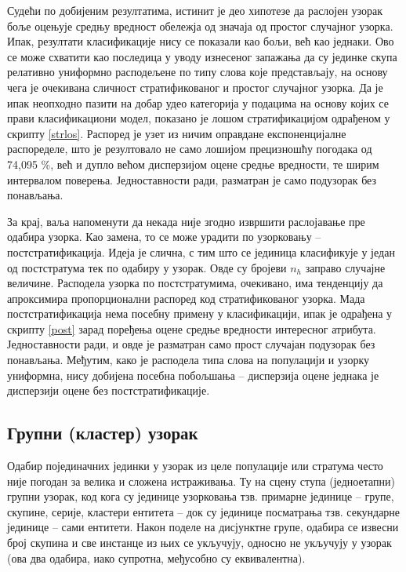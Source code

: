 \documentclass[a4paper]{article}
\begin{document}
Судећи по добијеним резултатима, истинит је део хипотезе да раслојен узорак боље оцењује средњу вредност обележја од значаја од простог случајног узорка. Ипак, резултати класификације нису се показали као бољи, већ као једнаки. Ово се може схватити као последица у уводу изнесеног запажања да су јединке скупа релативно униформно расподељене по типу слова које представљају, на основу чега је очекивана сличност стратификованог и простог случајног узорка. Да је ипак неопходно пазити на добар удео категорија у подацима на основу којих се прави класификациони модел,\cite{strat} показано је лошом стратификацијом одрађеном у скрипту \ref{strlos}. Распоред је узет из ничим оправдане експоненцијалне распоределе, што је резултовало не само лошијом прецизношћу погодака од 74,095 \%, већ и дупло већом дисперзијом оцене средње вредности, те ширим интервалом поверења. Једноставности ради, разматран је само подузорак без понављања.



За крај, ваља напоменути да некада није згодно извршити раслојавање пре одабира узорка. Као замена, то се може урадити по узорковању -- постстратификација.\cite{prez9} Идеја је слична, с тим што се јединица класификује у један од постстратума тек по одабиру у узорак. Овде су бројеви $n_h$ заправо случајне величине. Расподела узорка по постстратумима, очекивано, има тенденцију да апроксимира пропорционални распоред код стратификованог узорка. Мада постстратификација нема посебну примену у класификацији, ипак је одрађена у скрипту \ref{post} зарад поређења оцене средње вредности интересног атрибута. Једноставности ради, и овде је разматран само прост случајан подузорак без понављања. Међутим, како је расподела типа слова на популацији и узорку униформна, нису добијена посебна побољшања -- дисперзија оцене једнака је дисперзији оцене без постстратификације.



\subsection{Групни (кластер) узорак}

Одабир појединачних јединки у узорак из целе популације или стратума често није погодан за велика и сложена истраживања. Ту на сцену ступа (једноетапни) групни узорак, код кога су јединице узорковања тзв. примарне јединице -- групе, скупине, серије, кластери ентитета -- док су јединице посматрања тзв. секундарне јединице -- сами ентитети.\cite{prez9} Након поделе на дисјунктне групе, одабира се извесни број скупина и све инстанце из њих се укључују, односно не укључују у узорак (ова два одабира, иако супротна, међусобно су еквивалентна).
\end{document}
